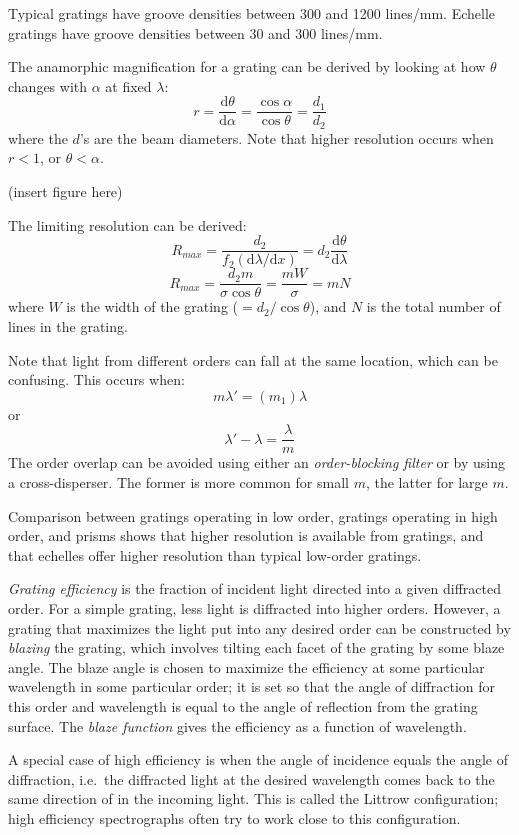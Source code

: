\documentclass[12pt]{article}
\begin{document}
Typical gratings have groove densities between 300 and 1200 lines/mm.
Echelle gratings have groove densities between 30 and 300 lines/mm.

The anamorphic magnification for a grating can be derived by looking
at how $\theta$ changes with $\alpha$ at fixed $\lambda$:{$$
    r = \frac{\textrm{d}\theta}{\textrm{d}\alpha} =
    \frac{\cos\alpha}{\cos\theta} =
    \frac{d_{1}}{d_{2}} $$
}where the $d$'s are the beam diameters. Note that higher resolution
occurs when $r < 1$, or $\theta < \alpha$.

(insert figure here)

The limiting resolution can be derived:{$$
    R_{max} = \frac{d_{2}}{f_{2}\left(\textrm{d}\lambda/\textrm{d}x\right)} =
    d_{2}\frac{\textrm{d}\theta}{\textrm{d}\lambda} $$$$
    R_{max} = \frac{d_{2}m}{\sigma\cos\theta} = \frac{mW}{\sigma} = mN $$
}where $W$ is the width of the grating ($=d_{2}/\cos\theta$), and $N$ is
the total number of lines in the grating.

Note that light from different orders can fall at the same location,
which can be confusing. This occurs when:{$$
    m\lambda' = (m_1)\lambda $$
}or{$$
    \lambda' - \lambda = \frac{\lambda}{m} $$
}The order overlap can be avoided using either an \emph{order-blocking filter}
or by using a cross-disperser. The former is more common for small $m$, the
latter for large $m$.

Comparison between gratings operating in low order, gratings operating in
high order, and prisms shows that higher resolution is
available from gratings, and that echelles offer higher resolution
than typical low-order gratings.

\emph{Grating efficiency} is the fraction of incident light
directed into a given diffracted order. For a
simple grating, less light is diffracted into higher orders. However,
a grating that maximizes the light put into any desired order can be
constructed by \emph{blazing} the grating, which involves tilting each
facet of the grating by some blaze angle. The blaze angle is chosen to
maximize the efficiency at some particular wavelength in some
particular order; it is set so that the angle of diffraction for this
order and wavelength is equal to the angle of reflection from the
grating surface. The \emph{blaze function} gives the efficiency as a function
of wavelength.

A special case of high efficiency is when the angle of incidence
equals the angle of diffraction, i.e.\ the diffracted light at the
desired wavelength comes back to the same direction of in the incoming
light. This is called the Littrow configuration; high efficiency
spectrographs often try to work close to this configuration.
\end{document}
